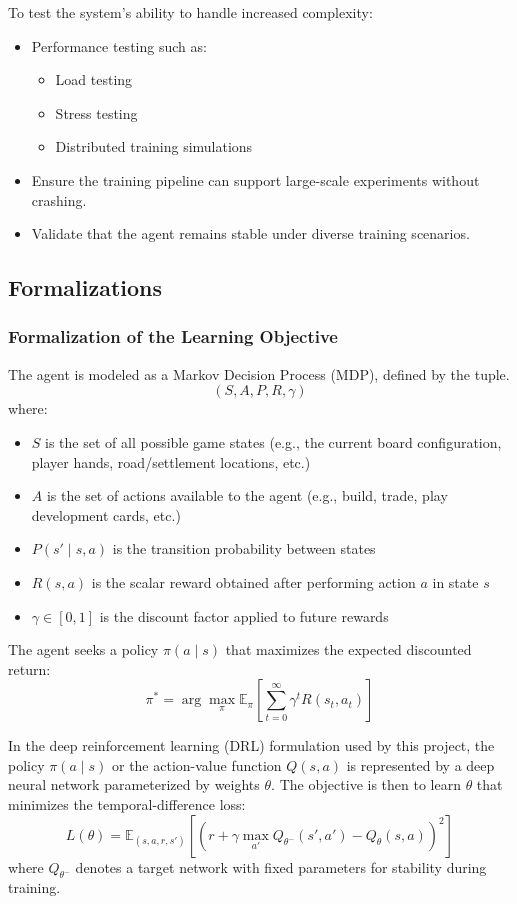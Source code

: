 \documentclass{article}
\begin{document}
To test the system’s ability to handle increased complexity:
\begin{itemize}
    \item Performance testing such as:
    \begin{itemize}
        \item Load testing
        \item Stress testing
        \item Distributed training simulations
    \end{itemize}
    \item Ensure the training pipeline can support large-scale experiments without crashing.
    \item Validate that the agent remains stable under diverse training scenarios.
\end{itemize}

\subsection{Formalizations}
\subsubsection{Formalization of the Learning Objective}
\label{sec:formalization}

The \RL{} agent is modeled as a Markov Decision Process (MDP), defined by the tuple.
\[
(S, A, P, R, \gamma)
\]
where:
\begin{itemize}
    \item $S$ is the set of all possible game states (e.g., the current board configuration, player hands, road/settlement locations, etc.)
    \item $A$ is the set of actions available to the agent (e.g., build, trade, play development cards, etc.)
    \item $P(s' \mid s, a)$ is the transition probability between states
    \item $R(s, a)$ is the scalar reward obtained after performing action $a$ in state $s$
    \item $\gamma \in [0, 1]$ is the discount factor applied to future rewards
\end{itemize}

The agent seeks a policy $\pi(a \mid s)$ that maximizes the expected discounted return:
\[
\pi^* = \arg\max_{\pi} \mathbb{E}_{\pi}\left[\sum_{t=0}^{\infty} \gamma^t R(s_t, a_t)\right]
\]

In the deep reinforcement learning (DRL) formulation used by this project, the policy $\pi(a \mid s)$ or the action-value function $Q(s, a)$ is represented by a deep neural network parameterized by weights $\theta$. The objective is then to learn $\theta$ that minimizes the temporal-difference loss:
\[
L(\theta) = \mathbb{E}_{(s, a, r, s')} \left[ \left( r + \gamma \max_{a'} Q_{\theta^-}(s', a') - Q_{\theta}(s, a) \right)^2 \right]
\]
where $Q_{\theta^-}$ denotes a target network with fixed parameters for stability during training.
\end{document}

